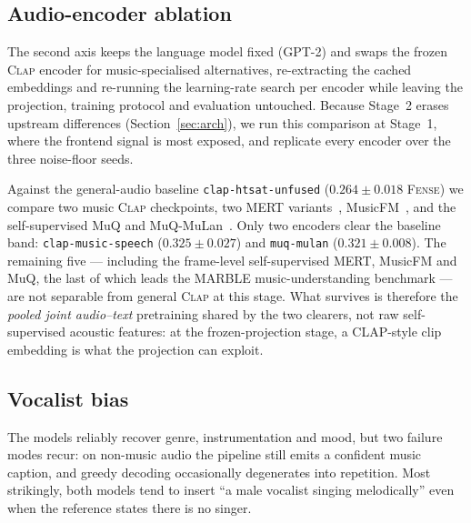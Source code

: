 \documentclass[conference]{IEEEtran}
\newcommand{\fense}{\textsc{Fense}}
\newcommand{\clapenc}{\textsc{Clap}}
\begin{document}
\subsection{Audio-encoder ablation}\label{sec:encoder}

The second axis keeps the language model fixed (GPT-2) and swaps the frozen \clapenc{} encoder
for music-specialised alternatives, re-extracting the cached embeddings and re-running the
learning-rate search per encoder while leaving the projection, training protocol and evaluation
untouched. Because Stage~2 erases upstream differences (Section~\ref{sec:arch}), we run this
comparison at Stage~1, where the frontend signal is most exposed, and replicate every encoder
over the three noise-floor seeds.

Against the general-audio baseline \texttt{clap-htsat-unfused} ($0.264\pm0.018$ \fense{}) we
compare two music \clapenc{} checkpoints, two MERT variants~\cite{li2024mert},
MusicFM~\cite{won2024musicfm}, and the self-supervised MuQ and MuQ-MuLan~\cite{zhu2025muq}. Only
two encoders clear the baseline band: \texttt{clap-music-speech} ($0.325\pm0.027$) and
\texttt{muq-mulan} ($0.321\pm0.008$). The remaining five --- including the frame-level
self-supervised MERT, MusicFM and MuQ, the last of which leads the MARBLE music-understanding
benchmark --- are not separable from general \clapenc{} at this stage. What survives is
therefore the \emph{pooled joint audio--text} pretraining shared by the two clearers, not raw
self-supervised acoustic features: at the frozen-projection stage, a CLAP-style clip embedding
is what the projection can exploit.

\subsection{Vocalist bias}\label{sec:qual}

The models reliably recover genre, instrumentation and mood, but two failure modes recur: on
non-music audio the pipeline still emits a confident music caption, and greedy decoding
occasionally degenerates into repetition. Most strikingly, both models tend to insert ``a male
vocalist singing melodically'' even when the reference states there is no singer.
\end{document}
